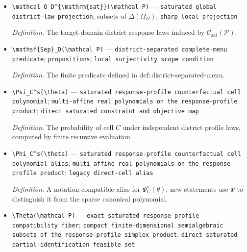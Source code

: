 \documentclass{article}
\begin{document}
\begin{itemize}
  \par\smallskip\noindent\emph{Definition.} The target-domain district response laws induced by \(\mathcal C(\mathcal P)\).
  \item \texttt{\textbackslash{}\allowbreak{}mathcal Q\_\allowbreak{}D\textasciicircum{}\{\textbackslash{}\allowbreak{}mathrm\{sat\}\allowbreak{}\}\allowbreak{}(\textbackslash{}\allowbreak{}mathcal P)} --- \texttt{saturated global district-\allowbreak{}law projection}; subsets of \(\Delta(\Omega_D)\); \texttt{sharp local projection}
  \par\smallskip\noindent\emph{Definition.} The target-domain district response laws induced by \(\mathcal C_{\mathrm{sat}}(\mathcal P)\).
  \item \texttt{\textbackslash{}\allowbreak{}mathsf\{Sep\}\allowbreak{}\_\allowbreak{}D(\textbackslash{}\allowbreak{}mathcal P)} --- \texttt{district-\allowbreak{}separated complete-\allowbreak{}menu predicate}; \texttt{propositions}; \texttt{local surjectivity scope condition}
  \par\smallskip\noindent\emph{Definition.} The finite predicate defined in \(\mathrm{def:district\text{-}separated\text{-}menu}\).
  \item \texttt{\textbackslash{}\allowbreak{}Psi\_\allowbreak{}C\textasciicircum{}s(\textbackslash{}\allowbreak{}theta)} --- \texttt{saturated response-\allowbreak{}profile counterfactual cell polynomial}; \texttt{multi-\allowbreak{}affine real polynomials on the response-\allowbreak{}profile product}; \texttt{direct saturated constraint and objective map}
  \par\smallskip\noindent\emph{Definition.} The probability of cell \(C\) under independent district profile laws, computed by finite recursive evaluation.
  \item \texttt{\textbackslash{}\allowbreak{}Phi\_\allowbreak{}C\textasciicircum{}s(\textbackslash{}\allowbreak{}theta)} --- \texttt{saturated response-\allowbreak{}profile counterfactual cell polynomial alias}; \texttt{multi-\allowbreak{}affine real polynomials on the response-\allowbreak{}profile product}; \texttt{legacy direct-\allowbreak{}cell alias}
  \par\smallskip\noindent\emph{Definition.} A notation-compatible alias for \(\Psi_C^s(\theta)\); new statements use \(\Psi\) to distinguish it from the sparse canonical polynomial.
  \item \texttt{\textbackslash{}\allowbreak{}Theta(\textbackslash{}\allowbreak{}mathcal P)} --- \texttt{exact saturated response-\allowbreak{}profile compatibility fiber}; \texttt{compact finite-\allowbreak{}dimensional semialgebraic subsets of the response-\allowbreak{}profile simplex product}; \texttt{direct saturated partial-\allowbreak{}identification feasible set}

\end{itemize}
\end{document}
